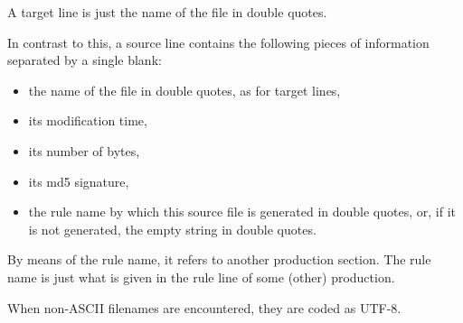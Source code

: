 \documentclass[a4paper, english]{article}%
\begin{document}
A target line is just the name of the file in double quotes. 

In contrast to this, a source line contains the following pieces of information 
separated by a single blank: 
%
\begin{itemize}
  \item the name of the file in double quotes, as for target lines, 
  \item its modification time, 
  \item its number of bytes, 
  \item its md5 signature, 
  \item the rule name by which this source file is generated in double quotes, 
  or, if it is not generated, the empty string in double quotes. 
\end{itemize}

By means of the rule name, it refers to another production section. 
The rule name is just what is given in the rule line of some (other) production. 


When non-ASCII filenames are encountered, they are coded as UTF-8.



{}%
\end{document}
